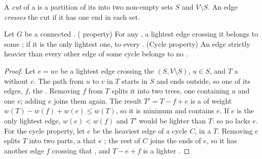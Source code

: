 \begin{definition}\label{def:b1:spanning-trees:cut}
A \emph{cut} of a  is a partition of its  into two non-empty sets $S$ and $V
\setminus S$. An edge \emph{crosses} the cut if it has one end in each set.
\end{definition}

\begin{theorem}\label{thm:b1:spanning-trees:cut-property}
Let $G$ be a connected . ( property) For any , a lightest edge crossing it belongs to some ; if it is the only lightest one, to every . (Cycle property) An edge strictly heavier
than every other edge of some cycle belongs to no .
\end{theorem}

\begin{proof}
Let $e = uv$ be a lightest edge crossing the  $(S, V \setminus S)$, $u \in S$, and $T$ a  without
$e$. The path from $u$ to $v$ in $T$ starts in $S$ and ends outside, so one of its edges, $f$,  the . Removing
$f$ from $T$ splits it into two trees, one containing $u$ and one $v$; adding $e$ joins them again. The result $T' = T
- f + e$ is a  of weight $w(T) - w(f) + w(e) \leq w(T)$, so it is minimum and contains $e$. If $e$ is the
only lightest edge, $w(e) < w(f)$ and $T'$ would be lighter than $T$: so no  lacks $e$. For the
cycle property, let $e$ be the heaviest edge of a cycle $C$, in a  $T$. Removing $e$ splits $T$ into two
parts, a  that $e$ ; the rest of $C$ joins the ends of $e$, so it has another edge $f$ crossing that , and
$T - e + f$ is a lighter .
\end{proof}

